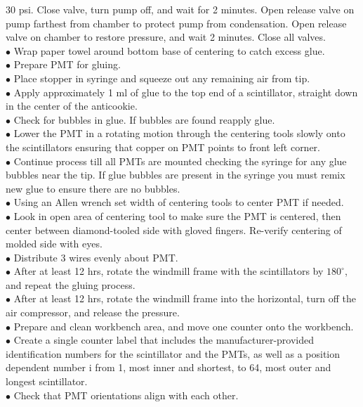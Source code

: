  $30$ psi. Close valve, turn pump off, and wait for 2 minutes. Open release valve
on pump farthest from chamber to protect pump from condensation. Open
release valve on chamber to restore pressure, and wait 2 minutes. Close all
valves.\\
$\bullet$ Wrap paper towel around bottom base of centering to catch excess glue.\\
$\bullet$ Prepare PMT for gluing.\\
$\bullet$ Place stopper in syringe and squeeze out any remaining air from tip.\\
$\bullet$ Apply approximately 1 ml of glue to the top end of a scintillator, straight down
in the center of the anticookie.\\
$\bullet$ Check for bubbles in glue. If bubbles are found reapply glue.\\
$\bullet$ Lower the PMT in a rotating motion through the centering tools slowly onto the
scintillators ensuring that copper on PMT points to front left corner.\\
$\bullet$ Continue process till all PMTs are mounted checking the syringe for any glue
bubbles near the tip. If glue bubbles are present in the syringe you must remix
new glue to ensure there are no bubbles.\\
$\bullet$ Using an Allen wrench set width of centering tools to center PMT if needed.\\
$\bullet$ Look in open area of centering tool to make sure the PMT is centered, then
center between diamond-tooled side with gloved fingers. Re-verify centering of
molded side with eyes.\\
$\bullet$ Distribute 3 wires evenly about PMT.\\
$\bullet$ After at least 12 hrs, rotate the windmill frame with the scintillators by $180^{\circ}$,
and repeat the gluing process.\\
$\bullet$ After at least 12 hrs, rotate the windmill frame into the horizontal, turn off the
air compressor, and release the pressure.\\
$\bullet$ Prepare and clean workbench area, and move one counter onto the workbench.\\
$\bullet$ Create a single counter label that includes the manufacturer-provided
identification numbers for the scintillator and the PMTs, as well as a position dependent
number i from 1, most inner and shortest, to 64, most outer and
longest scintillator.\\
$\bullet$ Check that PMT orientations align with each other.\\
